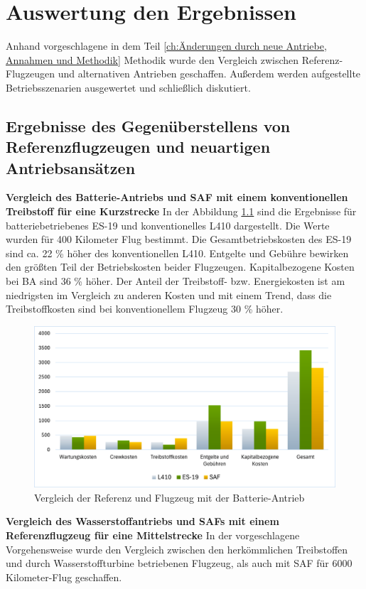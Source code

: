 \chapter{Auswertung den Ergebnissen}
\label{ch:Auswertung den Ergebnissen}
Anhand vorgeschlagene in dem Teil \ref{ch:Änderungen durch neue Antriebe, Annahmen und Methodik} Methodik wurde den Vergleich 
zwischen Referenz-Flugzeugen und alternativen Antrieben geschaffen.
Außerdem werden aufgestellte Betriebsszenarien ausgewertet und schließlich diskutiert.

\section{Ergebnisse des Gegenüberstellens von Referenzflugzeugen und neuartigen Antriebsansätzen}
%
\textbf{Vergleich des Batterie-Antriebs und SAF mit einem konventionellen Treibstoff für eine Kurzstrecke}
%
In der Abbildung \ref{vergleichBA_Ref} sind die Ergebnisse für batteriebetriebenes ES-19 und konventionelles L410 dargestellt.
Die Werte wurden für 400 Kilometer Flug bestimmt.
Die Gesamtbetriebskosten des ES-19 sind ca. 22 \% höher des konventionellen L410. Entgelte und Gebühre bewirken den größten Teil der Betriebskosten
beider Flugzeugen. Kapitalbezogene Kosten bei BA sind 36 \% höher. Der Anteil der Treibstoff- bzw. Energiekosten ist am niedrigsten 
im Vergleich zu anderen Kosten und mit einem Trend, dass die Treibstoffkosten sind bei konventionellem Flugzeug 30 \% höher.
\begin{figure}[h]
	\centering
	\includegraphics[width=0.9\linewidth]{Bilder/VergleichBA_Ref.png}
	\caption[Betriebskosten]{Vergleich der Referenz und Flugzeug mit der Batterie-Antrieb}
	\label{vergleichBA_Ref}
\end{figure}

\textbf{Vergleich des Wasserstoffantriebs und SAFs mit einem Referenzflugzeug für eine Mittelstrecke}
In der vorgeschlagene Vorgehensweise wurde den Vergleich zwischen den herkömmlichen Treibstoffen
und durch Wasserstoffturbine betriebenen Flugzeug, als auch mit SAF für 6000 Kilometer-Flug geschaffen. %

